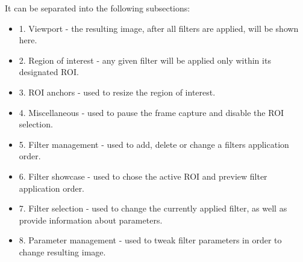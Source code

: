 It can be separated into the following subsections:
\begin{itemize}
	\item 1. Viewport - the resulting image, after all filters are applied, will be shown here.
	\item 2. Region of interest - any given filter will be applied only within its designated ROI.
	\item 3. ROI anchors - used to resize the region of interest.
	\item 4. Miscellaneous - used to pause the frame capture and disable the ROI selection.
	\item 5. Filter management - used to add, delete or change a filters application order.
	\item 6. Filter showcase - used to chose the active ROI and preview filter application order.
	\item 7. Filter selection - used to change the currently applied filter, as well as provide
	      information about parameters.
	\item 8. Parameter management - used to tweak filter parameters in order to change resulting image.
\end{itemize}




